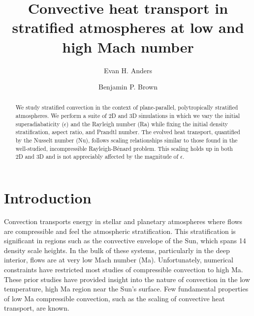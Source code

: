 \documentclass[aps, prfluids, onecolumn, notitlepage, nofootinbib, groupedaddress, amsfonts, amssymb, amsmath]{revtex4-1}
\begin{document}
\author{Evan H. Anders}
\author{Benjamin P. Brown}
\title{Convective heat transport in stratified atmospheres at low and high Mach number}

\begin{abstract}
We study stratified convection in the context of 
plane-parallel, polytropically stratified atmospheres. 
We perform a suite of 2D and 3D simulations in which we vary the initial
superadiabaticity ($\epsilon$) and the Rayleigh number (Ra) while fixing the
initial density stratification, aspect
ratio, and Prandtl number.
The evolved heat transport, 
quantified by the Nusselt number (Nu),
follows scaling relationships similar to those found in the well-studied, 
incompressible Rayleigh-B\'{e}nard problem.  This scaling holds up in both 2D and 3D and is not
appreciably affected by the magnitude of $\epsilon$. %
\end{abstract}
\maketitle


\section{Introduction}
\label{sec:intro}
Convection transports energy in stellar and planetary atmospheres
where flows are compressible and
feel the atmospheric stratification.  This stratification 
is significant in regions such as
the convective envelope of the Sun, which spans 14 density scale heights.
In the bulk of these systems, particularly in the deep interior,
flows are at very low Mach number (Ma).  Unfortunately,
numerical constraints have restricted most studies of 
compressible convection to high Ma.
These prior studies \cite{graham1975, chan&all1982,
hurlburt&all1984, cattaneo&all1990, brummell&all1996,
brandenburg&all2005} have provided insight into the nature of
convection in the low temperature,
high Ma region near the Sun's surface. Few fundamental
properties of low Ma compressible convection, such as the scaling of
convective heat transport, are known.
\end{document}
